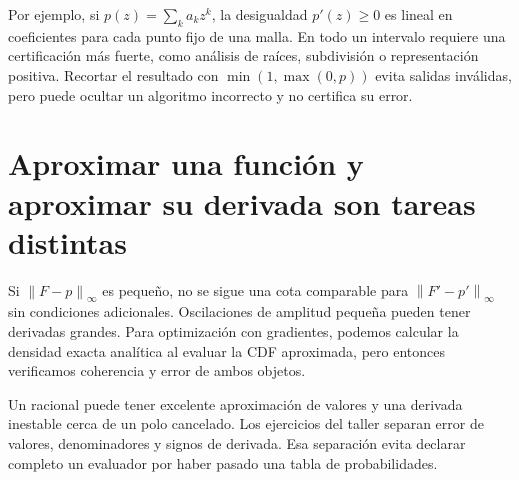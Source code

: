 \documentclass[11pt,a4paper]{article}
\newcommand{\norm}[1]{\left\lVert #1\right\rVert}
\theoremstyle{definition}
\begin{document}
Por ejemplo, si $p(z)=\sum_ka_kz^k$, la desigualdad $p'(z)\ge0$ es lineal en coeficientes para cada punto fijo de una malla.
En todo un intervalo requiere una certificación más fuerte, como análisis de raíces, subdivisión o representación positiva.
Recortar el resultado con $\min(1,\max(0,p))$ evita salidas inválidas, pero puede ocultar un algoritmo incorrecto y no certifica su error.

\section{Aproximar una función y aproximar su derivada son tareas distintas}
Si $\norm{F-p}_\infty$ es pequeño, no se sigue una cota comparable para $\norm{F'-p'}_\infty$ sin condiciones adicionales.
Oscilaciones de amplitud pequeña pueden tener derivadas grandes.
Para optimización con gradientes, podemos calcular la densidad exacta analítica al evaluar la CDF aproximada, pero entonces verificamos coherencia y error de ambos objetos.

Un racional puede tener excelente aproximación de valores y una derivada inestable cerca de un polo cancelado.
Los ejercicios del taller separan error de valores, denominadores y signos de derivada.
Esa separación evita declarar completo un evaluador por haber pasado una tabla de probabilidades.
\end{document}
